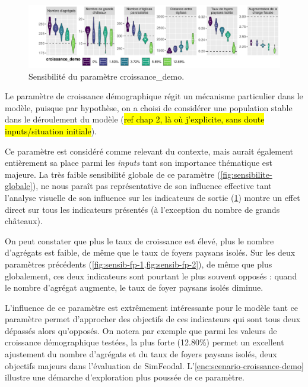 \begin{figure}[H]
	\centering
	\includegraphics[width=\linewidth]{img/sensib/sensibilite_croissance_demo.pdf}
	\caption{Sensibilité du paramètre \textsf{croissance\_demo}.}
	\label{fig:sensib-fp-3}
\end{figure}

Le paramètre de croissance démographique régit un mécanisme particulier dans le modèle, puisque par hypothèse, on a choisi de considérer une population stable dans le déroulement du modèle (\hl{ref chap 2, là où j'explicite, sans doute inputs/situation initiale}).

Ce paramètre est considéré comme relevant du contexte, mais aurait également entièrement sa place parmi les \textit{inputs} tant son importance thématique est majeure.
La très faible sensibilité globale de ce paramètre (\cref{fig:sensibilite-globale}), ne nous paraît pas représentative de son influence effective tant l'analyse visuelle de son influence sur les indicateurs de sortie (\cref{fig:sensib-fp-3}) montre un effet direct sur tous les indicateurs présentés (à l'exception du nombre de grands châteaux).

On peut constater que plus le taux de croissance est élevé, plus le nombre d'agrégats est faible, de même que le taux de foyers paysans isolés.
Sur les deux paramètres précédents (\cref{fig:sensib-fp-1,fig:sensib-fp-2}), de même que plus globalement, ces deux indicateurs sont pourtant le plus souvent opposés : quand le nombre d'agrégat augmente, le taux de foyer paysans isolés diminue.

L'influence de ce paramètre est extrêmement intéressante pour le modèle tant ce paramètre permet d'approcher des objectifs de ces indicateurs qui sont tous deux dépassés alors qu'opposés.
On notera par exemple que parmi les valeurs de croissance démographique testées, la plus forte (12.80\%) permet un excellent ajustement du nombre d'agrégats et du taux de foyers paysans isolés, deux objectifs majeurs dans l'évaluation de SimFeodal.
L'\cref{enc:scenario-croissance-demo} illustre une démarche d'exploration plus poussée de ce paramètre.

